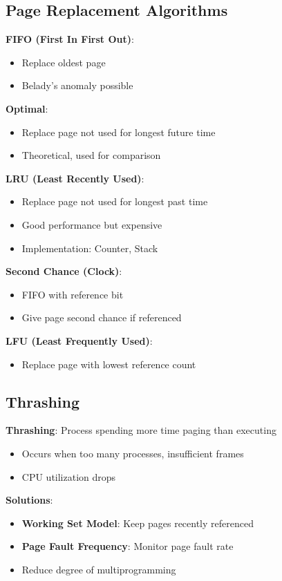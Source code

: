 \documentclass[12pt,a4paper]{report}
\begin{document}
\subsection{Page Replacement Algorithms}
\begin{concept}
\textbf{FIFO (First In First Out)}:
\begin{itemize}
    \item Replace oldest page
    \item Belady's anomaly possible
\end{itemize}

\textbf{Optimal}:
\begin{itemize}
    \item Replace page not used for longest future time
    \item Theoretical, used for comparison
\end{itemize}

\textbf{LRU (Least Recently Used)}:
\begin{itemize}
    \item Replace page not used for longest past time
    \item Good performance but expensive
    \item Implementation: Counter, Stack
\end{itemize}

\textbf{Second Chance (Clock)}:
\begin{itemize}
    \item FIFO with reference bit
    \item Give page second chance if referenced
\end{itemize}

\textbf{LFU (Least Frequently Used)}:
\begin{itemize}
    \item Replace page with lowest reference count
\end{itemize}
\end{concept}

\subsection{Thrashing}
\begin{concept}
\textbf{Thrashing}: Process spending more time paging than executing
\begin{itemize}
    \item Occurs when too many processes, insufficient frames
    \item CPU utilization drops
\end{itemize}

\textbf{Solutions}:
\begin{itemize}
    \item \textbf{Working Set Model}: Keep pages recently referenced
    \item \textbf{Page Fault Frequency}: Monitor page fault rate
    \item Reduce degree of multiprogramming
\end{itemize}
\end{concept}
\end{document}
